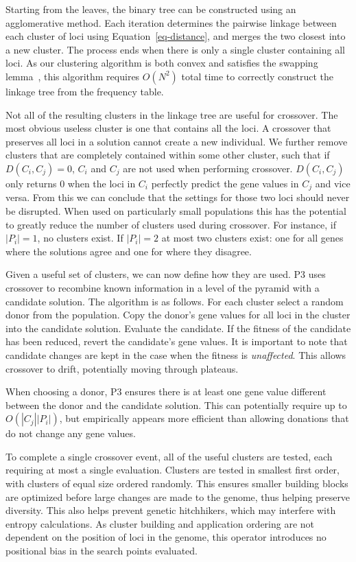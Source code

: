 \documentclass{sig-alternate}
\begin{document}
Starting from the leaves, the binary tree can be constructed using an
agglomerative method.  Each
iteration determines the pairwise linkage between each cluster of loci
using Equation~\ref{eq-distance}, and merges the two closest into a new
cluster.  The process ends when there is only a single cluster
containing all loci.  As our clustering algorithm is both convex and
satisfies the swapping lemma~\cite{gronau:2007:upgma}, this algorithm
requires $O(N^2)$ total time to correctly construct the linkage tree
from the frequency table.

Not all of  the resulting clusters in the linkage  tree are useful for
crossover.  The most obvious useless  cluster is one that contains all
the loci.   A crossover that preserves  all loci in  a solution cannot
create  a  new  individual.   We  further  remove  clusters  that  are
completely  contained   within  some  other  cluster,   such  that  if
$D(C_i,C_j)  =  0$, $C_i$  and  $C_j$  are  not used  when  performing
crossover.   $D(C_i,C_j)$ only  returns  $0$ when  the  loci in  $C_i$
perfectly predict the gene values in $C_j$ and vice versa. From this we can
conclude  that  the  settings  for  those two  loci  should  never  be
disrupted.  When  used on particularly small populations  this has the
potential  to  greatly  reduce  the  number of  clusters  used  during
crossover.  For  instance, if  $|P_i| = 1$,  no clusters exist. If
$|P_i| =  2$ at most two clusters  exist: one for all  genes where the
solutions agree and one for where they disagree.

Given a useful set of clusters, we can now define how they are used.
P3 uses crossover to recombine known information in a level of the
pyramid with a candidate solution.  The algorithm is as follows. For
each cluster select a random donor from the population.  Copy the
donor's gene values for all loci in the cluster into the candidate
solution.  Evaluate the candidate.  If the fitness of the candidate
has been reduced, revert the candidate's gene values.  It is important
to note that candidate changes are kept in the case when the fitness
is \emph{unaffected}.  This allows crossover to drift, potentially
moving through plateaus.

When choosing a donor, P3 ensures there is at least one gene value
different between the donor and the candidate solution.  This can
potentially require up to $O(|C_j||P_i|)$, but empirically appears
more efficient than allowing donations that do not change any gene
values.

To complete a single crossover event, all of the useful clusters are tested, each
requiring at most a single evaluation.  Clusters are tested in smallest first order,
with clusters of equal size ordered randomly.  This ensures smaller building blocks
are optimized before large changes are made to the genome, thus helping preserve
diversity.  This also helps prevent genetic hitchhikers, which may interfere with
entropy calculations.  As cluster building and application ordering are not dependent on
the position of loci in the genome, this operator introduces no positional bias in the search points
evaluated.
\end{document}
